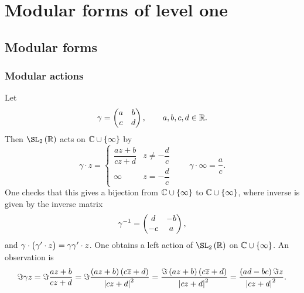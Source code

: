 \pagebreak

\section{Modular forms of level one}

\subsection{Modular forms}

\subsubsection{Modular actions}

Let
$$ \gamma = \begin{pmatrix} a & b \\ c & d \end{pmatrix}, \qquad a, b, c, d \in \mathbb{R}. $$
Then $ \SL_2\br{\RR} $ acts on $ \CC \cup \cbr{\infty} $ by
$$ \gamma \cdot z =
\begin{cases}
\dfrac{az + b}{cz + d} & z \ne -\dfrac{d}{c} \\
\infty & z = -\dfrac{d}{c}
\end{cases}
\qquad \gamma \cdot \infty = \dfrac{a}{c}.
$$
One checks that this gives a bijection from $ \CC \cup \cbr{\infty} $ to $ \CC \cup \cbr{\infty} $, where inverse is given by the inverse matrix
$$ \gamma^{-1} = \begin{pmatrix} d & -b \\ -c & a \end{pmatrix}, $$
and $ \gamma \cdot \br{\gamma' \cdot z} = \gamma\gamma' \cdot z $. One obtains a left action of $ \SL_2\br{\RR} $ on $ \CC \cup \cbr{\infty} $. An observation is
$$ \Im \gamma z = \Im \dfrac{az + b}{cz + d} = \Im \dfrac{\br{az + b}\br{c\overline{z} + d}}{\abs{cz + d}^2} = \dfrac{\Im \br{az + b}\br{c\overline{z} + d}}{\abs{cz + d}^2} = \dfrac{\br{ad - bc}\Im z}{\abs{cz + d}^2}. $$


